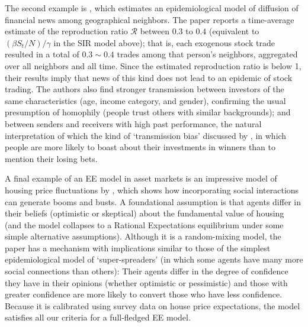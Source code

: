 The second example is \href{https://github.com/iworld1991/EpiExp/blob/master/Literature/huang2021rate.pdf}{ \cite{huang2021rate}}, which estimates an epidemiological model of diffusion of financial news among geographical neighbors. The paper reports a time-average estimate of the reproduction ratio $\mathcal{R}$ between $0.3$ to $0.4$ (equivalent to $(\beta S_t/N)/\gamma$ in the SIR model above); that is, each exogenous stock trade resulted in a total of $0.3{\sim}0.4$ trades among that person's neighbors, aggregated over all neighbors and all time.  Since the estimated reproduction ratio is below  1, their results imply that news of this kind does not lead to an epidemic of stock trading.    The authors also find stronger transmission between investors of the same characteristics (age, income category, and gender), confirming the usual presumption of homophily (people trust others with similar backgrounds); and between senders and receivers with high past performance, the natural interpretation of which the kind of `transmission bias' discussed by \cite{han2022social}, in which people are more likely to boast about their investments in winners than to mention their losing bets.

A final example of an EE model in asset markets is an impressive model of housing price fluctuations by \href{https://www.journals.uchicago.edu/doi/abs/10.1086/686732}{\cite{burnside_understanding_2016}}, which shows how incorporating social interactions can generate booms and busts. A foundational assumption is that agents differ in their beliefs (optimistic or skeptical) about the fundamental value of housing (and the model collapses to a Rational Expectations equilibrium under some simple alternative assumptions).  Although it is a random-mixing model, the paper has a mechanism with implications similar to those of the simplest epidemiological model of `super-spreaders' (in which some agents have many more social connections than others):  Their agents differ in the degree of confidence they have in their opinions (whether optimistic or pessimistic) and those with greater confidence are more likely to convert those who have less confidence.  Because it is calibrated using survey data on house price expectations, the model satisfies all our criteria for a full-fledged EE model.

